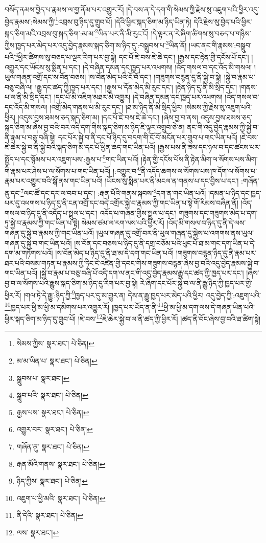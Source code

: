 བསོད་ནམས་བྱེད་པ་རྣམས་ལ་གྱ་ནོམ་པར་འགྱུར་རོ། །དེ་བས་ན་དེ་དག་གི་སེམས་ཀྱི་རྗེས་སུ་འཇུག་པའི་ཕྱིར་འདུ་བྱེད་རྣམས་:སེམས་ཀྱི་\footnote{སེམས་ཀྱིས་  སྣར་ཐང་།  པེ་ཅིན། }འབྲས་བུ་ཉིད་དུ་གྲུབ་པོ། །དེའི་ཕྱིར་སྐད་ཅིག་མ་ཉིད་ཡིན་ཏེ། དེའི་རྗེས་སུ་བྱེད་པའི་ཕྱིར་སྐད་ཅིག་མའི་འབྲས་བུ་སྐད་ཅིག་:མ་མ་\footnote{མ་མ་ཡིན་པ་  སྣར་ཐང་།  པེ་ཅིན། }ཡིན་པར་ནི་མི་རུང་ངོ། །དེ་ལྟར་ན་རེ་ཞིག་ཚིགས་སུ་བཅད་པ་གཉིས་ཀྱིས་ཁྱད་པར་མེད་པར་འདུ་བྱེད་རྣམས་སྐད་ཅིག་མ་ཉིད་དུ་:བསྒྲུབས་པ་\footnote{སྒྲུབས་པ་  སྣར་ཐང་། }ཡིན་ནོ། །ཡང་ནང་གི་རྣམས་:བསྒྲུབ་པའི་\footnote{སྒྲུབ་པའི་  སྣར་ཐང་།  པེ་ཅིན། }ཕྱིར་ཚིགས་སུ་བཅད་པ་ལྔར་རིག་པར་བྱ་སྟེ། དང་པོ་ཇེ་བས་ཇེ་ཆེ་དང་། །རྒྱས་དང་རྟེན་གྱི་དངོས་པོ་དང་། །འགྱུར་དང་ཡོངས་སུ་སྨིན་པ་དང་། །དེ་བཞིན་དམན་དང་ཁྱད་པར་འཕགས། །འོད་གསལ་བ་དང་འོད་མི་གསལ། །ཡུལ་གཞན་འགྲོ་དང་ས་བོན་བཅས། །ས་བོན་མེད་པའི་ངོ་བོ་དང་། །གཟུགས་བརྙན་དུ་ནི་སྐྱེ་བ་སྟེ། །སྐྱེ་བ་རྣམ་པ་བཅུ་བཞི་ལ། །རྒྱུ་དང་ཚད་ཀྱི་ཁྱད་པར་དང་། །རྒྱས་པ་དོན་མེད་མི་རུང་དང་། །རྟེན་ཉིད་དུ་ནི་མི་སྲིད་དང་། །གནས་པ་ལ་ནི་མི་སྲིད་དང་། །དང་པོ་མི་འཇིག་མཐར་མི་འགྱུར། །དེ་བཞིན་དམན་དང་ཁྱད་པར་འཕགས། །འོད་གསལ་བ་དང་འོད་མི་གསལ། །འགྲོ་མེད་གནས་པ་མི་རུང་དང་། །ཐ་མ་ཉིད་ནི་མི་སྲིད་ཕྱིར། །སེམས་ཀྱི་རྗེས་སུ་འཇུག་པའི་ཕྱིར། །འདུས་བྱས་ཐམས་ཅད་སྐད་ཅིག་མ། །དང་པོ་ཇེ་བས་ཇེ་ཆེ་དང་། །ཞེས་བྱ་བ་ནས། འདུས་བྱས་ཐམས་ཅད་སྐད་ཅིག་མ་ཞེས་བྱ་བའི་བར་འདི་དག་གིས་སྐད་ཅིག་མ་ཉིད་ཇི་ལྟར་འགྲུབ་ཅེ་ན། ནང་གི་འདུ་བྱེད་རྣམས་ཀྱི་སྐྱེ་བ་ནི་རྣམ་པ་བཅུ་བཞི་སྟེ། དང་པོར་སྐྱེ་བ་ནི་དང་པོ་ཉིད་དུ་བདག་གི་ངོ་བོ་མངོན་པར་གྲུབ་པ་གང་ཡིན་པའོ། །ཇེ་བས་ཇེ་ཆེར་སྐྱེ་བ་ནི་སྐྱེ་བའི་སྐད་ཅིག་མ་དང་པོ་ཕྱིན་ཆད་གང་ཡིན་པའོ། །རྒྱས་པས་ནི་ཟས་དང་ཉལ་བ་དང་ཚངས་པར་སྤྱོད་པ་དང་སྙོམས་པར་འཇུག་པས་:རྒྱས་པ་\footnote{རྒྱས་པས་  སྣར་ཐང་།  པེ་ཅིན། }གང་ཡིན་པའོ། །རྟེན་གྱི་དངོས་པོས་ནི་རྟེན་མིག་ལ་སོགས་པས་མིག་གི་རྣམ་པར་ཤེས་པ་ལ་སོགས་པ་གང་ཡིན་པའོ། །:འགྱུར་བ་\footnote{འགྱུར་བར་  སྣར་ཐང་།  པེ་ཅིན། }ནི་འདོད་ཆགས་ལ་སོགས་པས་ཁ་དོག་ལ་སོགས་པ་རྣམ་པར་འགྱུར་བའི་སྒོ་ནས་གང་ཡིན་པའོ། །ཡོངས་སུ་སྨིན་པར་ནི་མངལ་ན་གནས་པ་དང་བྱིས་པ་དང་། :གཞོན་ནུ་དང་\footnote{གཞོན་ནུ་  སྣར་ཐང་།  པེ་ཅིན། }ལང་ཚོ་དང་དར་ལ་བབ་པ་དང་། :རྒན་པོའི་གནས་སྐབས་\footnote{རྒན་མོའི་གནས་  སྣར་ཐང་།  པེ་ཅིན། }དག་ན་གང་ཡིན་པའོ། །དམན་པ་ཉིད་དང་ཁྱད་པར་དུ་འཕགས་པ་ཉིད་དུ་ནི་ངན་འགྲོ་དང་བདེ་འགྲོར་སྐྱེ་བ་རྣམས་ཀྱི་གང་ཡིན་པ་སྟེ་གོ་རིམས་བཞིན་ནོ། །འོད་གསལ་བ་ཉིད་དུ་ནི་འདོད་པ་སྤྲུལ་པ་དང་། འདོད་པ་གཞན་གྱིས་སྤྲུལ་པ་དང་། གཟུགས་དང་གཟུགས་མེད་པ་དག་ཏུ་སྐྱེ་བ་རྣམས་ཀྱི་གང་ཡིན་པ་སྟེ། སེམས་ཙམ་ལ་རག་ལས་པའི་ཕྱིར་རོ། །འོད་མི་གསལ་བ་ཉིད་དུ་ནི་དེ་ལས་གཞན་དུ་སྐྱེ་བ་རྣམས་ཀྱི་གང་ཡིན་པའོ། །ཡུལ་གཞན་དུ་འགྲོ་བར་ནི་ཡུལ་གཞན་དུ་སྐྱེས་པ་འགགས་ནས་ཡུལ་གཞན་དུ་སྐྱེ་བ་གང་ཡིན་པའོ། །ས་བོན་དང་བཅས་པ་ཉིད་དུ་ནི་དགྲ་བཅོམ་པའི་ཕུང་པོ་ཐ་མ་གང་དག་ཡིན་པ་དེ་དག་མ་གཏོགས་པའོ། །ས་བོན་མེད་པ་ཉིད་དུ་ནི་ཐ་མ་དེ་དག་གང་ཡིན་པའོ། །གཟུགས་བརྙན་ཉིད་དུ་ནི་རྣམ་པར་ཐར་པའི་བསམ་གཏན་པ་རྣམས་ཀྱི་ཏིང་ངེ་འཛིན་གྱི་དབང་གིས་གཟུགས་བརྙན་ཞེས་བྱ་བའི་འདུ་བྱེད་རྣམས་སྐྱེ་བ་གང་ཡིན་པའོ། །སྐྱེ་བ་རྣམ་པ་བཅུ་བཞི་པོ་འདི་དག་ལ་ནང་གི་འདུ་བྱེད་རྣམས་རྒྱུ་དང་ཚད་ཀྱི་ཁྱད་པར་དང་། །ཞེས་བྱ་བ་ལ་སོགས་པའི་རྒྱུས་སྐད་ཅིག་མ་ཉིད་དུ་རིག་པར་བྱ་སྟེ། རེ་ཞིག་དང་པོར་སྐྱེ་བ་ལ་ནི་རྒྱུ་ཉིད་ཀྱི་ཁྱད་པར་གྱི་ཕྱིར་རོ། །གལ་ཏེ་དེ་རྒྱུ་:ཉིད་ཀྱི་\footnote{ཉིད་ཀྱིས་  སྣར་ཐང་།  པེ་ཅིན། }ཁྱད་པར་དུ་མ་གྱུར་ན། དེས་ན་རྒྱུ་ཁྱད་པར་མེད་པའི་ཕྱིར། འདུ་བྱེད་ཀྱི་:འཇུག་པའི་\footnote{འཇུག་པ་ཕྱི་མའི་  སྣར་ཐང་།  པེ་ཅིན། }ཁྱད་པར་ཕྱི་མ་ཕྱི་མ་དམིགས་པར་འགྱུར་རོ། །ཁྱད་པར་ཡོད་ན་ནི་\footnote{ནི་དེའི་  སྣར་ཐང་།  པེ་ཅིན། }ཕྱི་མ་ཕྱི་མ་དག་ལས་དེ་གཞན་ཡིན་པའི་ཕྱིར་སྐད་ཅིག་མ་ཉིད་དུ་གྲུབ་པོ། །ཇེ་བས་\footnote{ལས་  སྣར་ཐང་། }ཇེ་ཆེར་སྐྱེ་བ་ལ་ནི་ཚད་ཀྱི་ཕྱིར་རོ། །ཚད་ནི་བོང་ཞེས་བྱ་བའི་ཐ་ཚིག་སྟེ། 